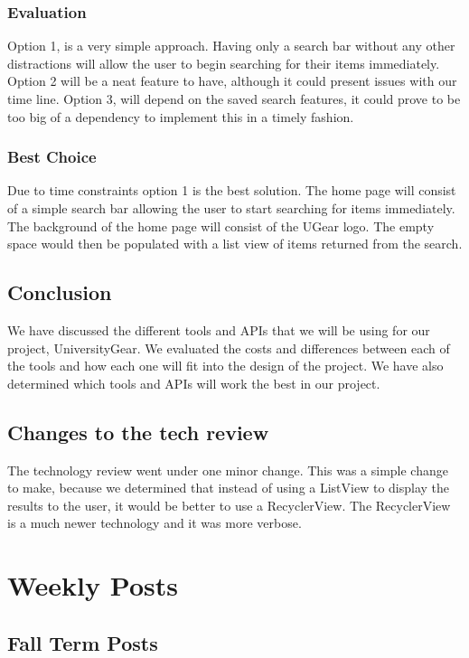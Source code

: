 \documentclass[journal,compsoc, 10pt, draftclsnofoot, onecolumn]{IEEEtran}
\begin{document}
\subsubsection*{Evaluation}
Option 1, is a very simple approach. Having only a search bar without any other 
distractions will allow the user to begin searching for their items immediately. 
Option 2 will be a neat feature to have, although it could present issues with 
our time line. Option 3, will depend on the saved search features, it could prove 
to be too big of a dependency to implement this in a timely fashion.
\subsubsection*{Best Choice}
Due to time constraints option 1 is the best solution. The home page will 
consist of a simple search bar allowing the user to start searching for items 
immediately. The background of the home page will consist of the UGear logo. 
The empty space would then be populated with a list view of items returned from the search.

\subsection{Conclusion}
We have discussed the different tools and APIs that we will be using for our
project, UniversityGear. We evaluated the costs and differences between each 
of the tools and how each one will fit into the design of the project. We have also 
determined which tools and APIs will work the best in our project.

\subsection{Changes to the tech review}
The technology review went under one minor change. This was a simple change to make, because we
determined that instead of using a ListView to display the results to the user, it would be
better to use a RecyclerView. The RecyclerView is a much newer technology and it was more
verbose.

\section{Weekly Posts}

\subsection{Fall Term Posts}
\end{document}
